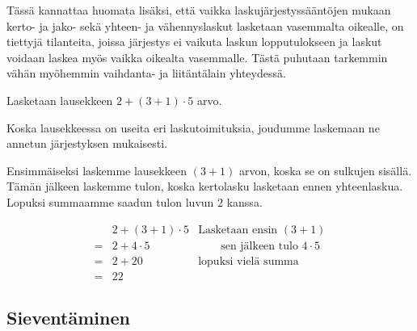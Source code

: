 Tässä kannattaa huomata lisäksi, että vaikka laskujärjestyssääntöjen mukaan kerto- ja jako- sekä yhteen- ja vähennyslaskut lasketaan vasemmalta oikealle, on tiettyjä tilanteita, joissa järjestys ei vaikuta laskun lopputulokseen ja laskut voidaan laskea myös vaikka oikealta vasemmalle. Tästä puhutaan tarkemmin vähän myöhemmin vaihdanta- ja liitäntälain yhteydessä.

\begin{esimerkki}
Lasketaan lausekkeen $2+(3+1)\cdot 5$ arvo.

Koska lausekkeessa on useita eri laskutoimituksia, joudumme laskemaan ne annetun järjestyksen mukaisesti.

Ensimmäiseksi laskemme lausekkeen $(3+1)$ arvon, koska se on sulkujen sisällä. Tämän jälkeen laskemme tulon, koska kertolasku lasketaan ennen yhteenlaskua. Lopuksi summaamme saadun tulon luvun $2$ kanssa.

\begin{align*}
   &2+(3+1)\cdot 5&\textrm{Lasketaan ensin } (3+1)
\\= &2+4\cdot5&\qquad\textrm{sen jälkeen tulo } 4\cdot 5
\\= &2+20& \textrm{lopuksi vielä summa}
\\= &22&
\end{align*}
\end{esimerkki}

%
%
%

\subsection{Sieventäminen}

